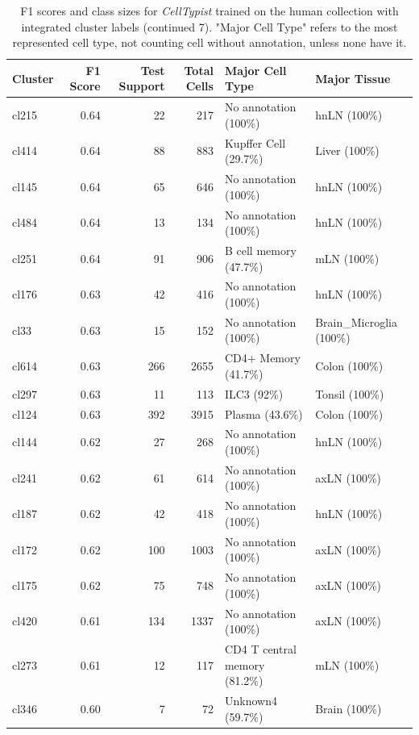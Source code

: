 \begin{table}[ht!]
\scriptsize
\caption[F1 scores and class sizes for \textit{CellTypist} trained on the human collection with integrated cluster labels (continued 7)]{F1 scores and class sizes for \textit{CellTypist} trained on the human collection with integrated cluster labels (continued 7). "Major Cell Type" refers to the most represented cell type, not counting cell without annotation, unless none have it.}
\centering
\label{table:tab_HAmodelclust7}
\begin{tabular}{lrrrll}
  \toprule
Cluster & F1 Score & Test Support & Total Cells & Major Cell Type & Major Tissue \\ 
  \midrule
  cl215 & 0.64 &  22 & 217 & No annotation (100\%) & hnLN (100\%) \\ 
  cl414 & 0.64 &  88 & 883 & Kupffer Cell (29.7\%) & Liver (100\%) \\ 
  cl145 & 0.64 &  65 & 646 & No annotation (100\%) & hnLN (100\%) \\ 
  cl484 & 0.64 &  13 & 134 & No annotation (100\%) & hnLN (100\%) \\ 
  cl251 & 0.64 &  91 & 906 & B cell memory (47.7\%) & mLN (100\%) \\ 
  cl176 & 0.63 &  42 & 416 & No annotation (100\%) & hnLN (100\%) \\ 
  cl33 & 0.63 &  15 & 152 & No annotation (100\%) & Brain\_Microglia (100\%) \\ 
  cl614 & 0.63 & 266 & 2655 & CD4+ Memory (41.7\%) & Colon (100\%) \\ 
  cl297 & 0.63 &  11 & 113 & ILC3 (92\%) & Tonsil (100\%) \\ 
  cl124 & 0.63 & 392 & 3915 & Plasma (43.6\%) & Colon (100\%) \\ 
  cl144 & 0.62 &  27 & 268 & No annotation (100\%) & hnLN (100\%) \\ 
  cl241 & 0.62 &  61 & 614 & No annotation (100\%) & axLN (100\%) \\ 
  cl187 & 0.62 &  42 & 418 & No annotation (100\%) & hnLN (100\%) \\ 
  cl172 & 0.62 & 100 & 1003 & No annotation (100\%) & axLN (100\%) \\ 
  cl175 & 0.62 &  75 & 748 & No annotation (100\%) & axLN (100\%) \\ 
  cl420 & 0.61 & 134 & 1337 & No annotation (100\%) & axLN (100\%) \\ 
  cl273 & 0.61 &  12 & 117 & CD4 T central memory (81.2\%) & mLN (100\%) \\ 
  cl346 & 0.60 &   7 &  72 & Unknown4 (59.7\%) & Brain (100\%) \\ 

\end{tabular}
\end{table}

